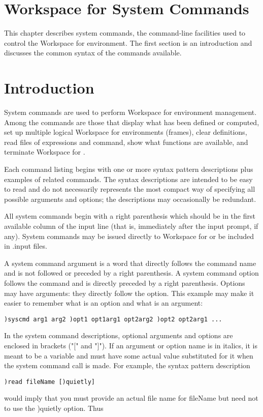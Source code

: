 \section{Workspace for \nr{} System Commands}

This chapter describes system commands, the command-line facilities used to control the Workspace for \nr{} environment. The first section is an introduction and discusses the common syntax of the commands available.

\section{Introduction}

System commands are used to perform Workspace for \nr{} environment management. Among the commands are those that display what has been defined or computed, set up multiple logical Workspace for \nr{} environments (frames), clear definitions, read files of expressions and command, show what functions are available, and terminate Workspace for \nr{}.

Each command listing begins with one or more syntax pattern descriptions plus examples of related commands. The syntax descriptions are intended to be easy to read and do not necessarily represents the most compact way of specifying all possible arguments and options; the descriptions may occasionally be redundant.

All system commands begin with a right parenthesis which should be in the first available column of the input line (that is, immediately after the input prompt, if any). System commands may be issued directly to Workspace for \nr{} or be included in .input files.

A system command argument is a word that directly follows the command name and is not followed or preceded by a right parenthesis. A system command option follows the command and is directly preceded by a right parenthesis. Options may have arguments: they directly follow the option. This example may make it easier to remember what is an option and what is an argument:
\begin{verbatim}
)syscmd arg1 arg2 )opt1 opt1arg1 opt2arg2 )opt2 opt2arg1 ...
\end{verbatim}
In the system command descriptions, optional arguments and options are enclosed in brackets ("[" and "]"). If an argument or option name is in italics, it is meant to be a variable and must have some actual value substituted for it when the system command call is made. For example, the syntax pattern description
\begin{verbatim}
)read fileName [)quietly]
\end{verbatim}
would imply that you must provide an actual file name for fileName but need not to use the )quietly option. Thus

